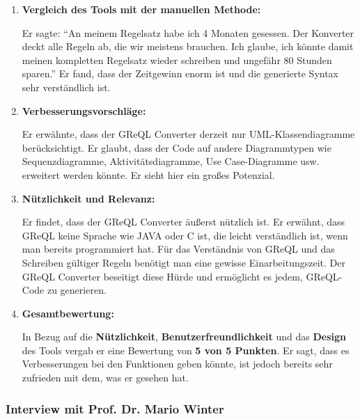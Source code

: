 \begin{enumerate}[itemsep=8pt, parsep=5pt]
    \item \textbf{Vergleich des Tools mit der manuellen Methode:}

    Er sagte: ``An meinem Regelsatz habe ich 4 Monaten gesessen. Der Konverter deckt alle Regeln ab, die wir meistens
    brauchen. Ich glaube, ich könnte damit meinen kompletten Regelsatz wieder schreiben und ungefähr 80 Stunden sparen.''
    Er fand, dass der Zeitgewinn enorm ist und die generierte Syntax sehr verständlich ist.

    \item \textbf{Verbesserungsvorschläge:}

    Er erwähnte, dass der GReQL Converter derzeit nur UML-Klassendiagramme berücksichtigt. Er glaubt, dass der Code auf
    andere Diagrammtypen wie Sequenzdiagramme, Aktivitätsdiagramme, Use Case-Diagramme usw. erweitert werden könnte.
    Er sieht hier ein großes Potenzial.

    \item \textbf{Nützlichkeit und Relevanz:}

    Er findet, dass der GReQL Converter äußerst nützlich ist. Er erwähnt, dass GReQL keine Sprache wie JAVA oder C ist,
    die leicht verständlich ist, wenn man bereits programmiert hat. Für das Verständnis von GReQL und das Schreiben
    gültiger Regeln benötigt man eine gewisse Einarbeitungszeit. Der GReQL Converter beseitigt diese Hürde und
    ermöglicht es jedem, GReQL-Code zu generieren.

    \item \textbf{Gesamtbewertung:}

    In Bezug auf die \textbf{Nützlichkeit}, \textbf{Benutzerfreundlichkeit} und das \textbf{Design} des Tools vergab er
    eine Bewertung von \textbf{5 von 5 Punkten}. Er sagt, dass es Verbesserungen bei den Funktionen geben könnte, ist
    jedoch bereits sehr zufrieden mit dem, was er gesehen hat.

\end{enumerate}

\subsubsection{Interview mit Prof. Dr. Mario Winter}

